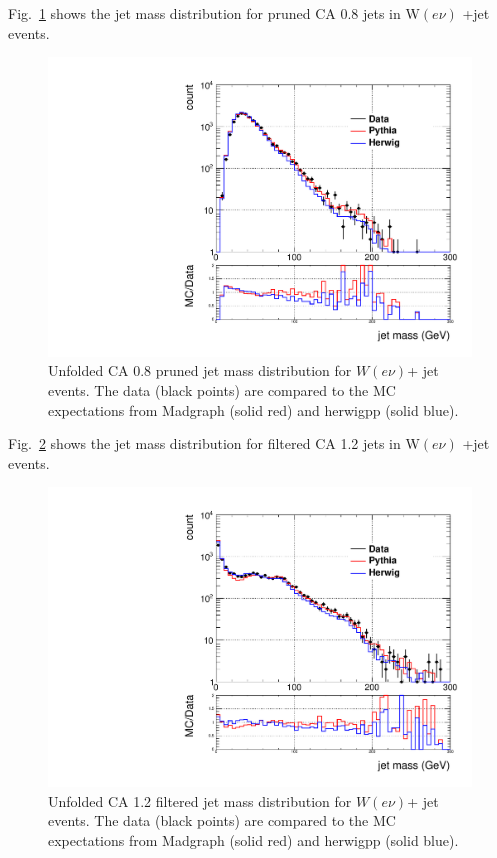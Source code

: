 Fig.~\ref{figs:prunedWenInt1} shows the jet mass distribution for pruned CA 0.8 jets in W$(e\nu)$ +jet events.

\begin{figure}[!htb]
\centering
\includegraphics[width=1.\textwidth]{figs/Wen/jetmassReco_ca8_allpT.pdf}
\caption{Unfolded CA 0.8 pruned jet mass distribution for $W(e\nu)$+ jet events. The data (black points) are compared to the MC expectations from Madgraph (solid red) and herwigpp (solid blue).}
\label{figs:prunedWenInt1}
\end{figure}


Fig.~\ref{figs:filteredWenInt1} shows the jet mass distribution for filtered CA 1.2 jets in W$(e\nu)$ +jet events.

\begin{figure}[!htb]
\centering
\includegraphics[width=1.\textwidth]{figs/Wen/jetmassReco_ca12mdft_allpT.pdf}
\caption{Unfolded CA 1.2 filtered jet mass distribution for $W(e\nu)$+ jet events. The data (black points) are compared to the MC expectations from Madgraph (solid red) and herwigpp (solid blue).}
\label{figs:filteredWenInt1}
\end{figure}





